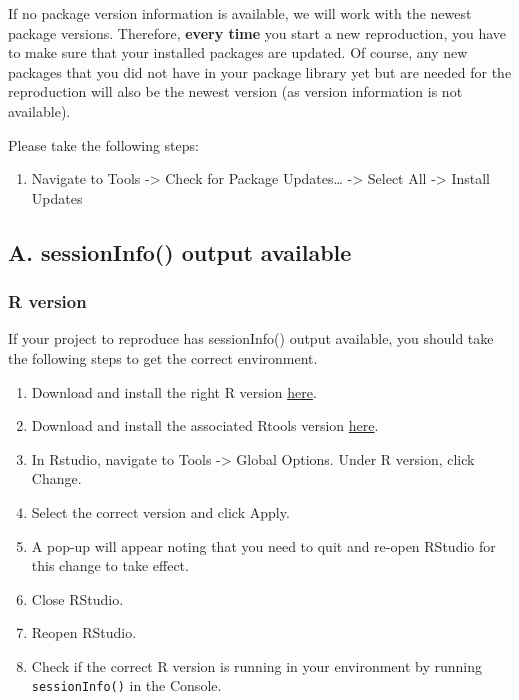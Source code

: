 \documentclass[
  letterpaper,
  DIV=11,
  numbers=noendperiod]{scrartcl}
\providecommand{\tightlist}{%
  \setlength{\itemsep}{0pt}\setlength{\parskip}{0pt}}\usepackage{longtable,booktabs,array}
\begin{document}
If no package version information is available, we will work with the
newest package versions. Therefore, \textbf{every time} you start a new
reproduction, you have to make sure that your installed packages are
updated. Of course, any new packages that you did not have in your
package library yet but are needed for the reproduction will also be the
newest version (as version information is not available).

Please take the following steps:

\begin{enumerate}
\def\labelenumi{\arabic{enumi}.}
\tightlist
\item
  Navigate to Tools -\textgreater{} Check for Package Updates\ldots{}
  -\textgreater{} Select All -\textgreater{} Install Updates
\end{enumerate}

\subsection{A. sessionInfo() output
available}\label{a.-sessioninfo-output-available}

\subsubsection{R version}\label{r-version-1}

If your project to reproduce has sessionInfo() output available, you
should take the following steps to get the correct environment.

\begin{enumerate}
\def\labelenumi{\arabic{enumi}.}
\tightlist
\item
  Download and install the right R version
  \href{https://cran.r-project.org/bin/windows/base/old/}{here}.
\item
  Download and install the associated Rtools version
  \href{https://cran.r-project.org/bin/windows/Rtools/}{here}.
\item
  In Rstudio, navigate to Tools -\textgreater{} Global Options. Under R
  version, click Change.
\item
  Select the correct version and click Apply.
\item
  A pop-up will appear noting that you need to quit and re-open RStudio
  for this change to take effect.
\item
  Close RStudio.
\item
  Reopen RStudio.
\item
  Check if the correct R version is running in your environment by
  running \texttt{sessionInfo()} in the Console.
\end{enumerate}
\end{document}
